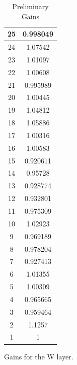 \begin{table}[h]
\begin{subtable}[h]{2in}
{\begin{tabular}{|c|c|}
25   &   0.998049  \\  \hline  
24   &   1.07542  \\  \hline  
23   &   1.01097  \\  \hline  
22   &   1.00608  \\  \hline  
21   &   0.995989  \\  \hline  
20   &   1.00445  \\  \hline  
19   &   1.04812  \\  \hline  
18   &   1.05886  \\  \hline  
17   &   1.00316  \\  \hline  
16   &   1.00583  \\  \hline  
15   &   0.920611  \\  \hline  
14   &   0.95728  \\  \hline  
13   &   0.928774  \\  \hline  
12   &   0.932801  \\  \hline  
11   &   0.975309  \\  \hline  
10   &   1.02923  \\  \hline  
9   &   0.969189  \\  \hline  
8   &   0.978204  \\  \hline  
7   &   0.927413  \\  \hline  
6   &   1.01355  \\  \hline  
5   &   1.00309  \\  \hline  
4   &   0.965665  \\  \hline  
3   &   0.959464  \\  \hline  
2   &   1.1257  \\  \hline  
1   &   1  \\  \hline  
        \end{tabular}
        }
        \caption{Gains for the W layer.}
    \end{subtable}
    \caption{Preliminary Gains}
\end{table}






